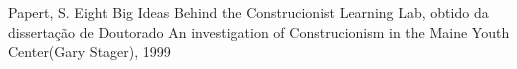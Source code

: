 \documentclass[
12pt,		%
openright,	%
twoside,  %
a4paper,			%
chapter=TITLE,		%
english,			%
french,				%
spanish,			%
brazil				%
]{USPSC-classe/USPSC}
\begin{document}
\begin{flushleft}
\begin{flushleft}
\begin{flushleft}
\begin{flushleft}
\begin{flushleft}
\begin{flushleft}
\begin{flushleft}
\begin{flushleft}
\begin{flushleft}
\begin{flushleft}
[PAPERT, 1999] Papert, S. Eight Big Ideas Behind the Construcionist Learning Lab, obtido da disserta\c{c}\~ao de Doutorado \textquotedbl An investigation of Construcionism in the Maine Youth Center\textquotedbl  (Gary Stager), 1999
\end{flushleft}


\end{flushleft}


\end{flushleft}


\end{flushleft}


\end{flushleft}


\end{flushleft}


\end{flushleft}


\end{flushleft}


\end{flushleft}


\end{flushleft}
\end{document}
